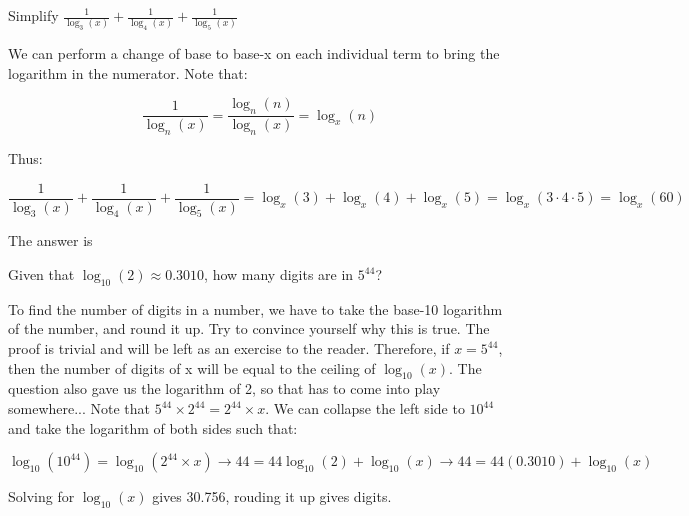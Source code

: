 \begin{question}

Simplify $\frac{1}{\log_3(x)} + \frac{1}{\log_4(x)} + \frac{1}{\log_5(x)}$

\end{question}

\begin{solution}
We can perform a change of base to base-x on each individual term to bring the logarithm in the numerator. Note that:

$$\frac{1}{\log_n(x)} = \frac{\log_n(n)}{\log_n(x)} = \log_x(n)$$

\newpage

Thus:

$$
\frac{1}{\log_3(x)} + \frac{1}{\log_4(x)} + \frac{1}{\log_5(x)} =
\log_x(3) + \log_x(4) + \log_x(5) =
\log_x(3 \cdot 4 \cdot 5) =
\log_x(60)
$$

The answer is 

\end{solution}

\begin{question}

Given that $\log_{10}(2) \approx 0.3010$, how many digits are in $5^44$?

\end{question}

\begin{solution}

To find the number of digits in a number, we have to take the base-10 logarithm of the number, and round it up. Try to convince yourself why this is true. The proof is trivial and will be left as an exercise to the reader.
\newline\newline
Therefore, if $x = 5^{44}$, then the number of digits of x will be equal to the ceiling of $\log_{10}(x)$. The question also gave us the logarithm of 2, so that has to come into play somewhere... Note that  $5^{44} \times 2^{44} = 2^{44} \times x$. We can collapse the left side to $10^{44}$ and take the logarithm of both sides such that:

$$
  \log_{10}(10^{44}) = \log_{10}(2^{44} \times x) \rightarrow
  44 = 44\log_{10}(2) + \log_{10}(x) \rightarrow
  44 = 44(0.3010) + \log_{10}(x)
$$

Solving for $\log_{10}(x)$ gives 30.756, rouding it up gives  digits.
\end{solution}

